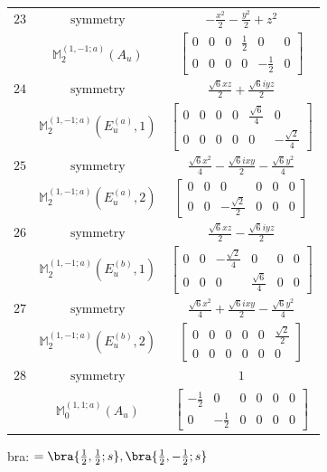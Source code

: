\documentclass[fleqn,8pt,landscape]{jsarticle}
\begin{document}
\begin{longtable}{ccc}
$ 23 $ & $ \text{symmetry} $ & $ - \frac{x^{2}}{2} - \frac{y^{2}}{2} + z^{2} $ \\
$  $ & $ \mathbb{M}_{2}^{(1,-1;a)}(A_{u}) $ & $ \begin{bmatrix} 0 & 0 & 0 & \frac{1}{2} & 0 & 0 \\ 0 & 0 & 0 & 0 & - \frac{1}{2} & 0 \end{bmatrix} $ \\ \hline
$ 24 $ & $ \text{symmetry} $ & $ \frac{\sqrt{6} x z}{2} + \frac{\sqrt{6} i y z}{2} $ \\
$  $ & $ \mathbb{M}_{2}^{(1,-1;a)}(E_{u}^{(a)},1) $ & $ \begin{bmatrix} 0 & 0 & 0 & 0 & \frac{\sqrt{6}}{4} & 0 \\ 0 & 0 & 0 & 0 & 0 & - \frac{\sqrt{2}}{4} \end{bmatrix} $ \\ \hline
$ 25 $ & $ \text{symmetry} $ & $ \frac{\sqrt{6} x^{2}}{4} - \frac{\sqrt{6} i x y}{2} - \frac{\sqrt{6} y^{2}}{4} $ \\
$  $ & $ \mathbb{M}_{2}^{(1,-1;a)}(E_{u}^{(a)},2) $ & $ \begin{bmatrix} 0 & 0 & 0 & 0 & 0 & 0 \\ 0 & 0 & - \frac{\sqrt{2}}{2} & 0 & 0 & 0 \end{bmatrix} $ \\ \hline
$ 26 $ & $ \text{symmetry} $ & $ \frac{\sqrt{6} x z}{2} - \frac{\sqrt{6} i y z}{2} $ \\
$  $ & $ \mathbb{M}_{2}^{(1,-1;a)}(E_{u}^{(b)},1) $ & $ \begin{bmatrix} 0 & 0 & - \frac{\sqrt{2}}{4} & 0 & 0 & 0 \\ 0 & 0 & 0 & \frac{\sqrt{6}}{4} & 0 & 0 \end{bmatrix} $ \\ \hline
$ 27 $ & $ \text{symmetry} $ & $ \frac{\sqrt{6} x^{2}}{4} + \frac{\sqrt{6} i x y}{2} - \frac{\sqrt{6} y^{2}}{4} $ \\
$  $ & $ \mathbb{M}_{2}^{(1,-1;a)}(E_{u}^{(b)},2) $ & $ \begin{bmatrix} 0 & 0 & 0 & 0 & 0 & \frac{\sqrt{2}}{2} \\ 0 & 0 & 0 & 0 & 0 & 0 \end{bmatrix} $ \\ \hline
$ 28 $ & $ \text{symmetry} $ & $ 1 $ \\
$  $ & $ \mathbb{M}_{0}^{(1,1;a)}(A_{u}) $ & $ \begin{bmatrix} - \frac{1}{2} & 0 & 0 & 0 & 0 & 0 \\ 0 & - \frac{1}{2} & 0 & 0 & 0 & 0 \end{bmatrix} $ \\ \hline
\end{longtable}
bra: $=\bra{\frac{1}{2},\frac{1}{2};s}, \bra{\frac{1}{2},- \frac{1}{2};s}$
\end{document}
